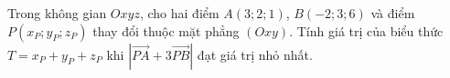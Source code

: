\begin{ex}
Trong không gian $Oxyz$, cho hai điểm $A(3;2;1)$, $B(-2;3;6)$ và điểm $P(x_P;y_P;z_P)$ thay đổi thuộc mặt phẳng $(Oxy)$. Tính giá trị của biểu thức $T=x_P+y_P+z_P$ khi $\left|\overrightarrow{PA}+3\overrightarrow{PB}\right|$ đạt giá trị nhỏ nhất.
\end{ex}
